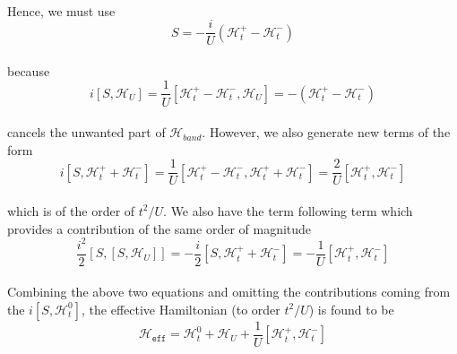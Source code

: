 \documentclass{article}
\begin{document}
\\
Hence, we must use 
\\
\begin{equation}
S = -\frac{i}{U} (\mathcal{H}_{t}^{+} - \mathcal{H}_{t}^{-})
\end{equation}
\\
because
\\
\begin{equation}
i[S, \mathcal{H}_U] = \frac{1}{U}[\mathcal{H}_{t}^{+} - \mathcal{H}_{t}^{-}, \mathcal{H}_U ] = -(\mathcal{H}_{t}^{+} - \mathcal{H}_{t}^{-})
\end{equation}
\\
cancels the unwanted part of $\mathcal{H}_{band}$. However, we also generate new terms of the form
\\
\begin{equation}
i[S, \mathcal{H}_{t}^{+} + \mathcal{H}_{t}^{-}] =  \frac{1}{U} [\mathcal{H}_{t}^{+} - \mathcal{H}_{t}^{-},\mathcal{H}_{t}^{+} + \mathcal{H}_{t}^{-}] = \frac{2}{U} [\mathcal{H}_{t}^{+}, \mathcal{H}_{t}^{-}]
\end{equation}
\\
which is of the order of $t^2/U$. We also have the term following term which provides a contribution of the same order of magnitude
\\
\begin{equation}
\frac{i^2}{2}[S, [S,\mathcal{H}_{U}]] = -\frac{i}{2}[S, \mathcal{H}_{t}^{+} + \mathcal{H}_{t}^{-}] = -\frac{1}{U} [\mathcal{H}_{t}^{+}, \mathcal{H}_{t}^{-}]
\end{equation}
\\
Combining the above two equations and omitting the contributions coming from the $i[S, \mathcal{H}_{t}^0]$, the effective Hamiltonian (to order $t^2/U$) is found to be 
\\ 
\begin{equation}
\mathcal{H}_{\texttt{eff}} = \mathcal{H}_{t}^0 + \mathcal{H}_{U} + \frac{1}{U} [\mathcal{H}_{t}^{+}, \mathcal{H}_{t}^{-}]
\end{equation}
\end{document}
